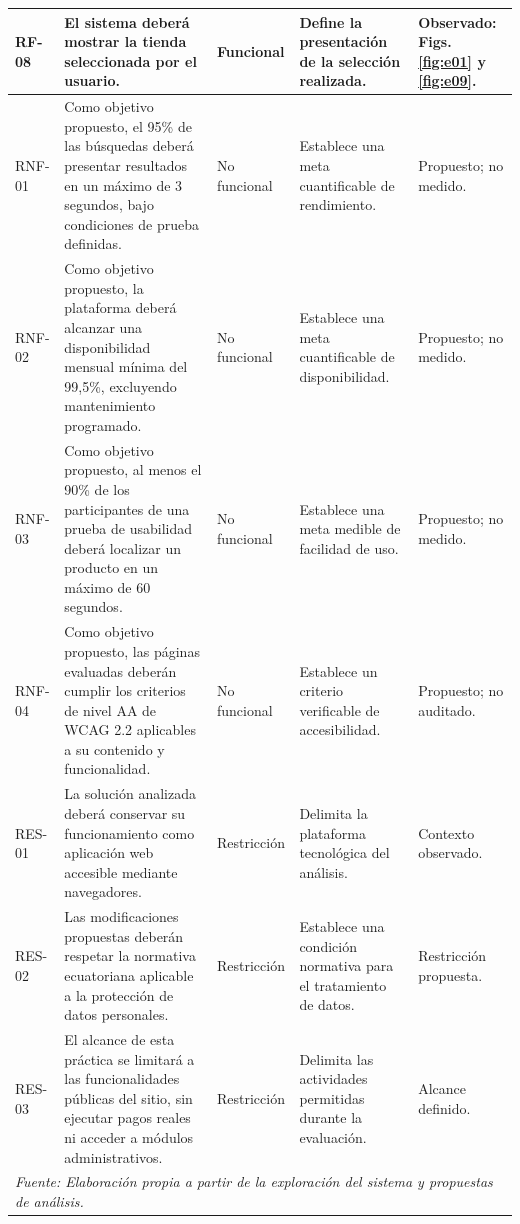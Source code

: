 \begin{landscape}
\begin{longtable}{
|p{1.4cm}|p{8cm}|p{2.5cm}|p{5.5cm}|p{3cm}|}
RF-08 &
El sistema deberá mostrar la tienda seleccionada por el usuario. &
Funcional &
Define la presentación de la selección realizada. &
Observado: Figs. \ref{fig:e01} y \ref{fig:e09}. \\
\hline

RNF-01 &
Como objetivo propuesto, el 95\% de las búsquedas deberá presentar resultados en un máximo de 3 segundos, bajo condiciones de prueba definidas. &
No funcional &
Establece una meta cuantificable de rendimiento. &
Propuesto; no medido. \\
\hline

RNF-02 &
Como objetivo propuesto, la plataforma deberá alcanzar una disponibilidad mensual mínima del 99,5\%, excluyendo mantenimiento programado. &
No funcional &
Establece una meta cuantificable de disponibilidad. &
Propuesto; no medido. \\
\hline

RNF-03 &
Como objetivo propuesto, al menos el 90\% de los participantes de una prueba de usabilidad deberá localizar un producto en un máximo de 60 segundos. &
No funcional &
Establece una meta medible de facilidad de uso. &
Propuesto; no medido. \\
\hline

RNF-04 &
Como objetivo propuesto, las páginas evaluadas deberán cumplir los criterios de nivel AA de WCAG 2.2 aplicables a su contenido y funcionalidad. &
No funcional &
Establece un criterio verificable de accesibilidad. &
Propuesto; no auditado. \\
\hline

RES-01 &
La solución analizada deberá conservar su funcionamiento como aplicación web accesible mediante navegadores. &
Restricción &
Delimita la plataforma tecnológica del análisis. &
Contexto observado. \\
\hline

RES-02 &
Las modificaciones propuestas deberán respetar la normativa ecuatoriana aplicable a la protección de datos personales. &
Restricción &
Establece una condición normativa para el tratamiento de datos. &
Restricción propuesta. \\
\hline

RES-03 &
El alcance de esta práctica se limitará a las funcionalidades públicas del sitio, sin ejecutar pagos reales ni acceder a módulos administrativos. &
Restricción &
Delimita las actividades permitidas durante la evaluación. &
Alcance definido. \\
\hline


\multicolumn{5}{l}{\footnotesize\textit{Fuente: Elaboración propia a partir de la exploración del sistema y propuestas de análisis.}}\\

\end{longtable}
\endgroup
\end{landscape}

